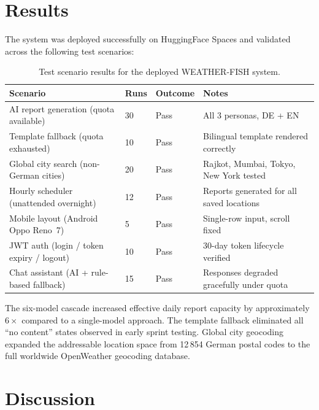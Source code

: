 \documentclass[11pt, a4paper]{article}
\begin{document}
\section{Results}

The system was deployed successfully on HuggingFace Spaces and validated across the
following test scenarios:

\begin{table}[H]
  \centering
  \caption{Test scenario results for the deployed WEATHER-FISH system.}
  \label{tab:results}
  \begin{tabularx}{\linewidth}{@{}lllX@{}}
    \toprule
    \textbf{Scenario} & \textbf{Runs} & \textbf{Outcome} & \textbf{Notes} \\
    \midrule
    AI report generation (quota available)   & 30 & Pass & All 3 personas, DE + EN \\
    Template fallback (quota exhausted)      & 10 & Pass & Bilingual template rendered correctly \\
    Global city search (non-German cities)   & 20 & Pass & Rajkot, Mumbai, Tokyo, New York tested \\
    Hourly scheduler (unattended overnight)  & 12 & Pass & Reports generated for all saved locations \\
    Mobile layout (Android Oppo Reno~7)      & 5  & Pass & Single-row input, scroll fixed \\
    JWT auth (login / token expiry / logout) & 10 & Pass & 30-day token lifecycle verified \\
    Chat assistant (AI + rule-based fallback)& 15 & Pass & Responses degraded gracefully under quota \\
    \bottomrule
  \end{tabularx}
\end{table}

The six-model cascade increased effective daily report capacity by approximately
$6\times$ compared to a single-model approach. The template fallback eliminated all
``no content'' states observed in early sprint testing. Global city geocoding expanded
the addressable location space from 12\,854 German postal codes to the full worldwide
OpenWeather geocoding database.

\section{Discussion}
\end{document}
